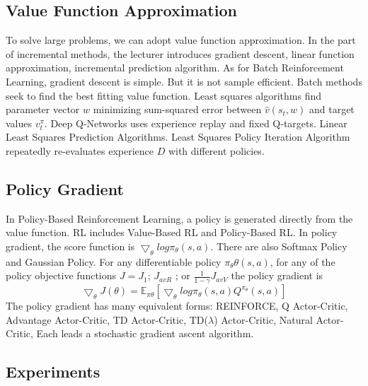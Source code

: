 \documentclass[10pt,twocolumn,letterpaper]{article}
\begin{document}
	\subsection{Value Function Approximation}
	To solve large problems, we can adopt value function approximation. In the part of incremental methods, the lecturer introduces gradient descent, linear function approximation, incremental prediction algorithm. As for Batch Reinforcement Learning, gradient descent is simple. But it is not sample efficient. Batch methods seek to find the best fitting value function. Least squares algorithms find parameter vector $w$ minimizing sum-squared error between $\hat{v}(s_t, w)$ and target values $v_t^\pi$. Deep Q-Networks uses experience replay and fixed Q-targets. Linear Least Squares Prediction Algorithms. Least Squares Policy Iteration Algorithm repeatedly re-evaluates experience $D$ with different policies.
	\subsection{Policy Gradient}
	In Policy-Based Reinforcement Learning, a policy is generated directly from the value function. RL includes Value-Based RL and Policy-Based RL. In policy gradient, the score function is $\bigtriangledown_\theta log\pi_\theta(s,a)$. There are also Softmax Policy and Gaussian Policy. For any differentiable policy $\pi_\theta\theta(s, a)$, for any of the policy objective functions $J = J_1$; $J_{avR}$ ; or $\frac{1}{1-\gamma}$$J_{avV}$
	the policy gradient is$$\bigtriangledown_\theta J(\theta)=\mathbb{E}_{\pi \theta}[\bigtriangledown_\theta log \pi_\theta(s, a)Q^{\pi_\theta}(s, a)]$$
	The policy gradient has many equivalent forms: REINFORCE, Q Actor-Critic, Advantage Actor-Critic, TD Actor-Critic, TD($\lambda$) Actor-Critic, Natural Actor-Critic, Each leads a stochastic gradient ascent algorithm.
	\subsection{Experiments}
	
\end{document}
